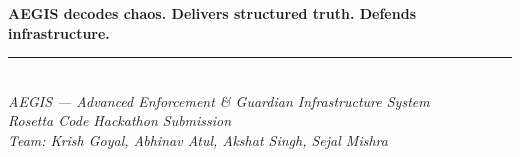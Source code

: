 \documentclass[12pt,a4paper]{article}
\begin{document}
\begin{infobox}
\centering
\textbf{AEGIS decodes chaos. Delivers structured truth. Defends infrastructure.}
\end{infobox}

\vspace{1em}
\begin{center}
\rule{0.5\linewidth}{0.4pt}\\[0.4em]
{\small\textit{AEGIS --- Advanced Enforcement \& Guardian Infrastructure System\\
Rosetta Code Hackathon Submission\\
Team: Krish Goyal, Abhinav Atul, Akshat Singh, Sejal Mishra}}
\end{center}
\end{document}
